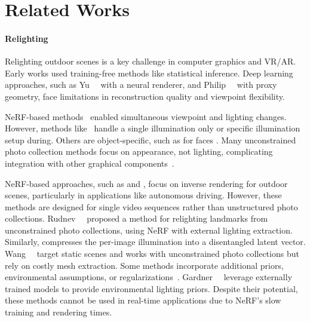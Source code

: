
\section{Related Works}
  \label{sec:lumigauss-related_works}

  \paragraph{Relighting}
    Relighting outdoor scenes is a key challenge in computer graphics and
    VR/AR.
    Early works \cite{lalonde2009webcam, troccoli2005relighting,
    haber2009relighting, xing2013lighting, sunkavalli2007factored,
    duchene2015multi, barron2014shape} used training-free methods like
    statistical inference.
    Deep learning approaches, such as Yu~\etal~\cite{yu2020self} with a neural
    renderer, and Philip~\etal~\cite{philip2019multi} with proxy geometry,
    face limitations in reconstruction quality and viewpoint flexibility.

    NeRF-based methods~\cite{mildenhall2021nerf} enabled simultaneous
    viewpoint and lighting changes.
    However, methods like~\cite{zhang2021nerfactor, zeng2023nrhints,
    srinivasan2021nerv} handle a single illumination only or specific
    illumination setup during.
    Others are object-specific, such as for faces \cite{sun2021nelf}.
    Many unconstrained photo collection methods focus on appearance, not
    lighting, complicating integration with other graphical
    components~\cite{martin2021nerfw, chen2022hallucinated, yang2023crnerf,
    li2023msnerf}.

    NeRF-based approaches, such as \cite{pun2023lightsim} and \cite{urbanir},
    focus on inverse rendering for outdoor scenes, particularly in
    applications like autonomous driving.
    However, these methods are designed for single video sequences rather than
    unstructured photo collections.
    Rudnev~\etal~\cite{rudnev2022nerfosr} proposed a method for relighting
    landmarks from unconstrained photo collections, using NeRF with external
    lighting extraction.
    Similarly, \cite{li2022neulighting} compresses the per-image illumination
    into a disentangled latent vector.
    Wang~\etal~\cite{wang2023fegr} target static scenes and works with
    unconstrained photo collections but rely on costly mesh extraction.
    Some methods incorporate additional priors, environmental assumptions, or
    regularizations~\cite{solnerf, yang2023complementary}.
    Gardner~\etal~\cite{gardner2023neusky} leverage externally trained models
    to provide environmental lighting priors.
    Despite their potential, these methods cannot be used in real-time
    applications due to NeRF’s slow training and rendering times.

